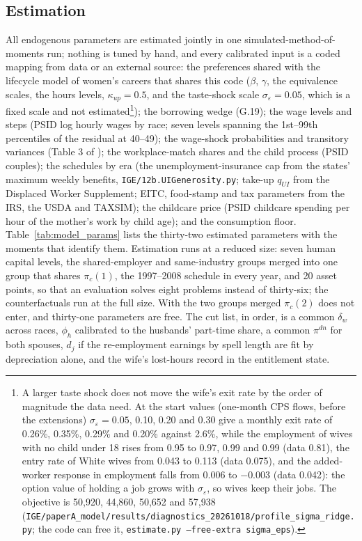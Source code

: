 \subsection{Estimation}\label{sec:estimation}

All endogenous parameters are estimated jointly in one simulated-method-of-moments run; nothing is tuned by hand, and
every calibrated input is a coded mapping from data or an external source: the preferences shared with the lifecycle
model of women's careers that shares this code ($\beta$, $\gamma$, the equivalence scales, the hours levels,
$\kappa_{up} = 0.5$, and the taste-shock scale $\sigma_\varepsilon = 0.05$, which is a fixed scale and not
estimated\footnote{A larger taste shock does not move the wife's exit rate by the order of magnitude the data need. At
the start values (one-month CPS flows, before the extensions) $\sigma_\varepsilon = 0.05$, 0.10, 0.20 and 0.30 give a
monthly exit rate of 0.26\%, 0.35\%, 0.29\% and 0.20\% against 2.6\%, while the employment of wives with no child under
18 rises from 0.95 to 0.97, 0.99 and 0.99 (data 0.81), the entry rate of White wives from 0.043 to 0.113 (data 0.075),
and the added-worker response in employment falls from 0.006 to $-0.003$ (data 0.042): the option value of holding a
job grows with $\sigma_\varepsilon$, so wives keep their jobs. The objective is 50{,}920, 44{,}860, 50{,}652 and
57{,}938 (\texttt{IGE/paperA\_model/results/diagnostics\_20261018/profile\_sigma\_ridge.py}; the code can free it,
\texttt{estimate.py --free-extra sigma\_eps}).}); the borrowing wedge (G.19); the wage levels and steps (PSID log hourly wages by race; seven levels
spanning the 1st--99th percentiles of the residual at 40--49); the wage-shock probabilities and transitory variances
(Table 3 of \citealp{blundell2016consumption}); the workplace-match shares and the child process (PSID couples); the
schedules by era (the unemployment-insurance cap from the states' maximum weekly benefits,
\texttt{IGE/12b.UIGenerosity.py}; take-up $q_{UI}$ from the Displaced Worker Supplement; EITC, food-stamp and tax
parameters from the IRS, the USDA and TAXSIM); the childcare price (PSID childcare spending per hour of the mother's
work by child age); and the consumption floor. Table~\ref{tab:model_params} lists the thirty-two estimated parameters
with the moments that identify them. Estimation runs at a reduced size: seven human capital levels, the shared-employer
and same-industry groups merged into one group that shares $\pi_c(1)$, the 1997--2008 schedule in every year, and 20
asset points, so that an evaluation solves eight problems instead of thirty-six; the counterfactuals run at the full
size. With the two groups merged $\pi_c(2)$ does not enter, and thirty-one parameters are free. The cut list, in
order, is a common $\delta_w$ across races, $\phi_h$ calibrated to the husbands' part-time share, a common $\pi^{dn}$
for both spouses, $d_j$ if the re-employment earnings by spell length are fit by depreciation alone, and the wife's
lost-hours record in the entitlement state.


